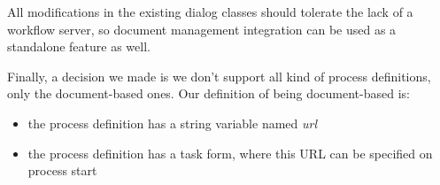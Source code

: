 All modifications in the existing dialog classes should tolerate the lack of a
workflow server, so document management integration can be used as a standalone
feature as well.

Finally, a decision we made is we don't support all kind of process
definitions, only the document-based ones. Our definition of being
document-based is:

\begin{itemize}
\item the process definition has a string variable named \emph{url}
\item the process definition has a task form, where this URL can be specified on process start
\end{itemize}

